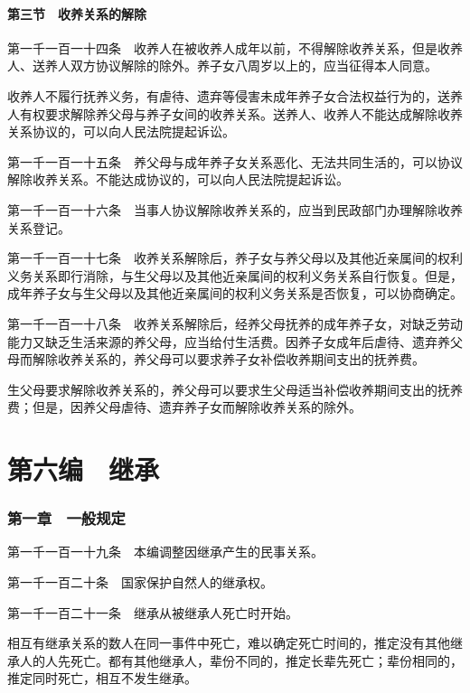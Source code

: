 \documentclass[UTF8,12pt,a4paper]{ctexbook}
\begin{document}
\subsection*{第三节　收养关系的解除}

第一千一百一十四条　收养人在被收养人成年以前，不得解除收养关系，但是收养人、送养人双方协议解除的除外。养子女八周岁以上的，应当征得本人同意。

收养人不履行抚养义务，有虐待、遗弃等侵害未成年养子女合法权益行为的，送养人有权要求解除养父母与养子女间的收养关系。送养人、收养人不能达成解除收养关系协议的，可以向人民法院提起诉讼。

第一千一百一十五条　养父母与成年养子女关系恶化、无法共同生活的，可以协议解除收养关系。不能达成协议的，可以向人民法院提起诉讼。

第一千一百一十六条　当事人协议解除收养关系的，应当到民政部门办理解除收养关系登记。

第一千一百一十七条　收养关系解除后，养子女与养父母以及其他近亲属间的权利义务关系即行消除，与生父母以及其他近亲属间的权利义务关系自行恢复。但是，成年养子女与生父母以及其他近亲属间的权利义务关系是否恢复，可以协商确定。

第一千一百一十八条　收养关系解除后，经养父母抚养的成年养子女，对缺乏劳动能力又缺乏生活来源的养父母，应当给付生活费。因养子女成年后虐待、遗弃养父母而解除收养关系的，养父母可以要求养子女补偿收养期间支出的抚养费。

生父母要求解除收养关系的，养父母可以要求生父母适当补偿收养期间支出的抚养费；但是，因养父母虐待、遗弃养子女而解除收养关系的除外。

\cleardoublepage
{}
\part*{第六编　继承}

\section*{第一章　一般规定}

第一千一百一十九条　本编调整因继承产生的民事关系。

第一千一百二十条　国家保护自然人的继承权。

第一千一百二十一条　继承从被继承人死亡时开始。

相互有继承关系的数人在同一事件中死亡，难以确定死亡时间的，推定没有其他继承人的人先死亡。都有其他继承人，辈份不同的，推定长辈先死亡；辈份相同的，推定同时死亡，相互不发生继承。
\end{document}
